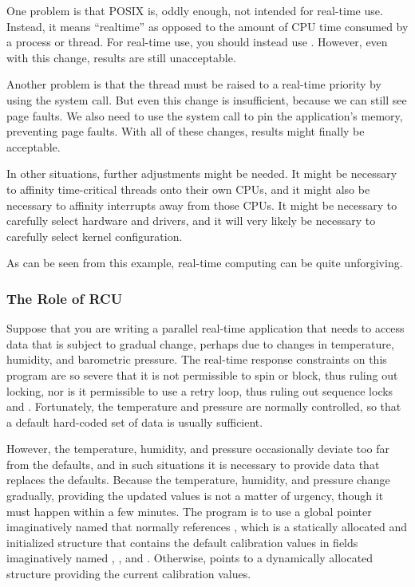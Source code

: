 One problem is that POSIX  is, oddly enough, not intended
for real-time use.
Instead, it means ``realtime'' as opposed to the amount of CPU time
consumed by a process or thread.
For real-time use, you should instead use .
However, even with this change, results are still unacceptable.

Another problem is that the thread must be raised to a real-time
priority by using the  system call.
But even this change is insufficient, because we can still see
page faults.
We also need to use the  system call to pin the
application's memory, preventing page faults.
With all of these changes, results might finally be acceptable.

In other situations, further adjustments might be needed.
It might be necessary to affinity time-critical threads onto their
own CPUs, and it might also be necessary to affinity interrupts
away from those CPUs.
It might be necessary to carefully select hardware and drivers,
and it will very likely be necessary to carefully select kernel
configuration.

As can be seen from this example, real-time computing can be quite
unforgiving.

\subsubsection{The Role of RCU}
\label{sec:advsync:The Role of RCU}

Suppose that you are writing a parallel real-time application that needs
to access
data that is subject to gradual change, perhaps due to changes in
temperature, humidity, and barometric pressure.
The real-time response constraints on this program are so severe that
it is not permissible to spin or block, thus ruling out locking,
nor is it permissible to use a retry loop, thus ruling out sequence locks
and .
Fortunately, the temperature and pressure are normally controlled,
so that a default hard-coded set of data is usually sufficient.

However, the temperature, humidity, and pressure occasionally deviate too far
from the defaults, and in such situations it is necessary to provide
data that replaces the defaults.
Because the temperature, humidity, and pressure change gradually,
providing the updated values is not a matter of urgency, though
it must happen within a few minutes.
The program is to use a global pointer imaginatively named 
that normally references , which is a statically allocated
and initialized structure that contains the default calibration values
in fields imaginatively named , , and .
Otherwise,  points to a dynamically allocated
structure providing the current calibration values.

